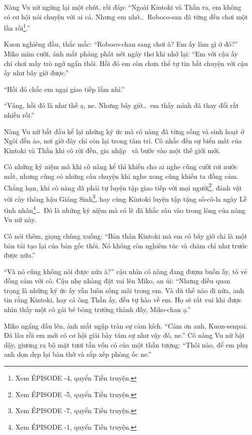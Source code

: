 \documentclass[../main.tex]{subfiles}
\begin{document}
Nàng Vu nữ ngừng lại một chút, rồi đáp: ``Ngoài Kintoki và Thần ra, em không có cơ hội nói chuyện với ai cả. Nhưng em nhớ\dots\ Roboco-san đã từng đến chơi một lần rồi\footnote{Xem {\flaregothic ÉPISODE -4}, quyển Tiền truyện.}.''

Kuon nghiêng đầu, thắc mắc: ``Roboco-chan sang chơi à? Em ấy làm gì ở đó?'' Miko mỉm cười, ánh mắt phảng phất nét ngây thơ khi nhớ lại: ``Em với cậu ấy chỉ chơi mấy trò ngớ ngẩn thôi. Hồi đó em còn chưa thể tự tin bắt chuyện với cậu ấy như bây giờ được.''

``Hồi đó chắc em ngại giao tiếp lắm nhỉ.''

``Vâng, hồi đó là như thế ạ, ne. Nhưng bây giờ\dots\ em thấy mình đã thay đổi rất nhiều rồi.''

Nàng Vu nữ bắt đầu kể lại những ký ức mà cô nàng đã từng sống và sinh hoạt ở Ngôi đền ảo, nơi giờ đây chỉ còn lại trong tâm trí. Cô nhắc đến sự biến mất của Kintoki và Thần khi cô rời đền, gia nhập \hll\ và bước vào một thế giới mới.

Có những kỷ niệm mà khi cô nàng kể thì khiến cho ai nghe cũng cười rơi nước mắt, nhưng cũng có những câu chuyện khi nghe xong cũng khiến ta đồng cảm. Chẳng hạn, khi cô nàng đã phải tự luyện tập giao tiếp với mọi người\footnote{Xem {\flaregothic ÉPISODE -5}, quyển Tiền truyện.}, đánh vật với cây thông hậu Giáng Sinh\footnote{Xem {\flaregothic ÉPISODE -7}, quyển Tiền truyện.}, hay cùng Kintoki luyện tập tặng sô-cô-la ngày Lễ tình nhân\footnote{Xem {\flaregothic ÉPISODE -1}, quyển Tiền truyện.}\dots\ Đó là những kỷ niệm mà có lẽ đã khắc sâu vào trong lòng của nàng Vu nữ này.

Cô nói thêm, giọng chùng xuống: ``Bản thân Kintoki mà em có bây giờ chỉ là một bản tái tạo lại của bản gốc thôi. Nó không còn nghiêm túc và chăm chỉ như trước được nữa.''

``Và nó cũng không nói được nữa à?'' cậu nhìn cô nàng đang đượm buồn ấy, tỏ vẻ đồng cảm với cô. Cậu nhẹ nhàng đặt vai lên Miko, an ủi: ``Nhưng điều quan trọng là những ký ức ấy vẫn luôn sống mãi trong em. Và dù thế nào đi nữa, anh tin rằng Kintoki, hay cả ông Thần ấy, đều tự hào về em. Họ sẽ rất vui khi được nhìn thấy một cô gái bé bỏng trưởng thành đấy, Miko-chan ạ.''

Miko ngẩng đầu lên, ánh mắt ngập tràn sự cảm kích. ``Cảm ơn anh, Kuon-senpai. Đã lâu rồi em mới có cơ hội giãi bày tâm sự như vậy đó, ne.'' Cô nàng Vu nữ bật dậy, giương ra bộ mặt tươi tắn vốn có của một thần tượng: ``Thôi nào, để em phụ anh dọn dẹp lại bàn thờ và sắp xếp phòng ốc ne.''
\end{document}

